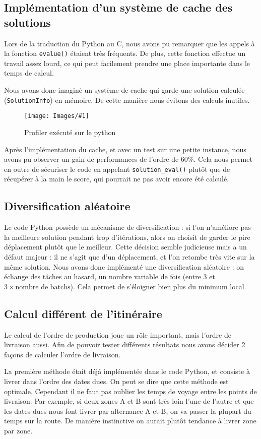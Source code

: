 \documentclass[hideweeklyreports]{polytech/polytech}
\newcommand{\img}[3]{%
	\begin{figure}[H]
		\centering
   		\texttt{[image: Images/\#1]}
  	 	\caption{#2}
	\end{figure}
}
\newcommand{\codec}[1]{\texttt{#1}}
\begin{document}
			\subsection{\label{cache}Implémentation d'un système de cache des solutions}
				Lors de la traduction du Python au C, nous avons pu remarquer que les appels à la fonction \codec{evalue()} étaient très fréquents. De plus, cette fonction effectue un travail assez lourd, ce qui peut facilement prendre une place importante dans le temps de calcul.
				
				Nous avons donc imaginé un système de cache qui garde une solution calculée (\codec{SolutionInfo}) en mémoire. De cette manière nous évitons des calculs inutiles.
				
				\img{PythonProfilerTop.png}{Profiler exécuté sur le python}{0.3}
				
				Après l'implémentation du cache, et avec un test sur une petite instance, nous avons pu observer un gain de performances de l'ordre de 60\%. Cela nous permet en outre de sécuriser le code en appelant \codec{solution\_eval()} plutôt que de récupérer à la main le score, qui pourrait ne pas avoir encore été calculé.
			
			\subsection{\label{diversificationAleatoire}Diversification aléatoire}
				Le code Python possède un mécanisme de diversification : si l'on n'améliore pas la meilleure solution pendant trop d'itérations, alors on choisit de garder le pire déplacement plutôt que le meilleur. Cette décision semble judicieuse mais a un défaut majeur : il ne s'agit que d'un déplacement, et l'on retombe très vite sur la même solution. Nous avons donc implémenté une diversification aléatoire : on échange des tâches au hasard, un nombre variable de fois (entre 3 et $3 \times \text{nombre de batchs}$). Cela permet de s'éloigner bien plus du minimum local.
				
			\subsection{\label{deliveries}Calcul différent de l'itinéraire}
				Le calcul de l'ordre de production joue un rôle important, mais l'ordre de livraison aussi. Afin de pouvoir tester différents résultats nous avons décider 2 façons de calculer l'ordre de livraison.
				
				La première méthode était déjà implémentée dans le code Python, et consiste à livrer dans l'ordre des dates dues. On peut se dire que cette méthode est optimale. Cependant il ne faut pas oublier les temps de voyage entre les points de livraison. Par exemple, si deux zones A et B sont très loin l'une de l'autre et que les dates dues nous font livrer par alternance A et B, on va passer la plupart du temps sur la route. De manière instinctive on aurait plutôt tendance à livrer zone par zone.
				
\end{document}
